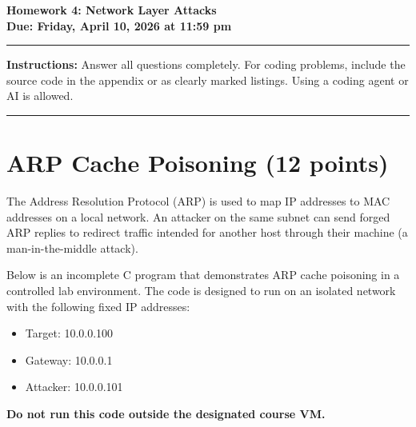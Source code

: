 \documentclass[11pt]{article}
\begin{document}
\begin{center}
    {\huge\bfseries Homework 4: Network Layer Attacks}\\[4pt]
    \textbf{Due: Friday, April 10, 2026 at 11:59 pm}\\
\end{center}

\vspace{0.5em}\hrule\vspace{1em}

\noindent\textbf{Instructions:} Answer all questions completely. For coding problems, include the source code in the appendix or as clearly marked listings. Using a coding agent or AI is allowed.

\vspace{0.5em}\hrule\vspace{1em}


\vspace{2em}

\section*{ARP Cache Poisoning (12 points)}

The Address Resolution Protocol (ARP) is used to map IP addresses to MAC addresses on a local network. An attacker on the same subnet can send forged ARP replies to redirect traffic intended for another host through their machine (a man-in-the-middle attack).

Below is an incomplete C program that demonstrates ARP cache poisoning in a controlled lab environment. The code is designed to run on an isolated network with the following fixed IP addresses:
\begin{itemize}
    \item Target: 10.0.0.100
    \item Gateway: 10.0.0.1
    \item Attacker: 10.0.0.101
\end{itemize}
\textbf{Do not run this code outside the designated course VM.}
\end{document}
